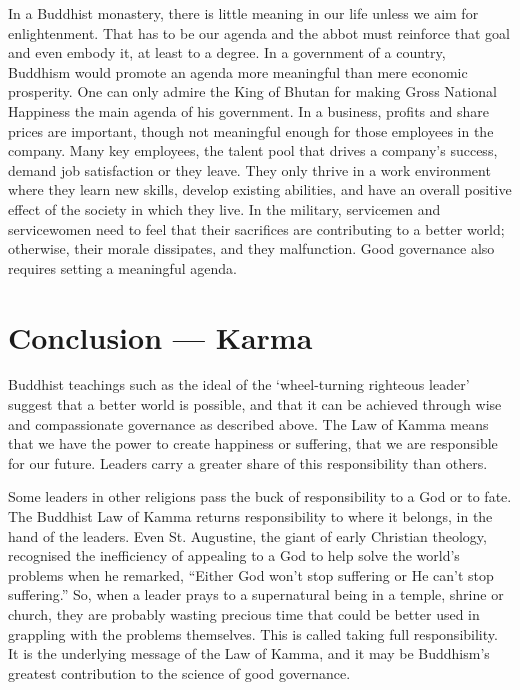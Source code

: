 ﻿\documentclass[11pt, openany]{book}
\begin{document}
In a Buddhist monastery, there is little meaning in our life unless we aim for enlightenment. That has to be our agenda and the abbot must reinforce that goal and even embody it, at least to a degree. In a government of a country, Buddhism would promote an agenda more meaningful than mere economic prosperity. One can only admire the King of Bhutan for making Gross National Happiness the main agenda of his government. In a business, profits and share prices are important, though not meaningful enough for those employees in the company. Many key employees, the talent pool that drives a company’s success, demand job satisfaction or they leave. They only thrive in a work environment where they learn new skills, develop existing abilities, and have an overall positive effect of the society in which they live. In the military, servicemen and servicewomen need to feel that their sacrifices are contributing to a better world; otherwise, their morale dissipates, and they malfunction. Good governance also requires setting a meaningful agenda.

\chapter*{Conclusion — Karma}

Buddhist teachings such as the ideal of the ‘wheel-turning
 righteous leader’ suggest that a better world is possible, and
that it can be achieved through wise and compassionate governance as described above. The Law of Kamma means that we have the power to create happiness or suffering, that we are responsible for our future. Leaders carry a greater share of this responsibility than others.

Some leaders in other religions pass the buck of responsibility to a God or to fate. The Buddhist Law of Kamma returns responsibility to where it belongs, in the hand of the leaders. Even St. Augustine, the giant of early Christian theology, recognised the inefficiency of appealing to a God to help solve the world’s problems when he remarked, “Either God won’t stop suffering or He can’t stop suffering.” So, when a leader prays to a supernatural being in a temple, shrine or church, they are probably wasting precious time that could be better used in grappling with the problems themselves. This is called taking full responsibility. It is the underlying message of the Law of Kamma, and it may be Buddhism’s greatest contribution to the science of good governance.


\newpage
\end{document}
